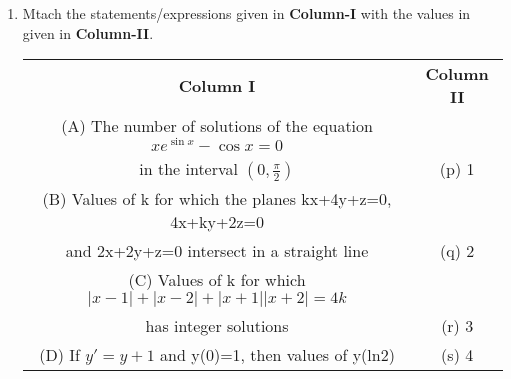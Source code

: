 \begin{enumerate}[label=\arabic*.,ref=\thesubsection.\theenumi]
\clearpage
\item Mtach the statements/expressions given in \textbf{Column-I} with the values in given in \textbf{Column-II}.
\begin{table}[ht!]
\centering
\begin{tabular}{c c} 
 \textbf{Column I} & \textbf{Column II}\\ [0.5ex] 
 (A) The number of solutions of the equation
     $xe^{\sin x}-\cos x=0$\\
     in the interval $(0, \frac{\pi}{2})$                   &(p) 1\\ 
 (B) Values of k for which the planes
      kx+4y+z=0, 4x+ky+2z=0\\ and 2x+2y+z=0
      intersect in a straight line                          &(q) 2\\
 (C) Values of k for which
     $|x-1|+|x-2|+|x+1||x+2|=4k$\\
     has integer solutions                                  &(r) 3\\
 (D) If $y'=y+1$ and y(0)=1,
     then values of y(ln2)                                  &(s) 4\\[1ex]
                                                            
\end{tabular}
\end{table}


\end{enumerate}
